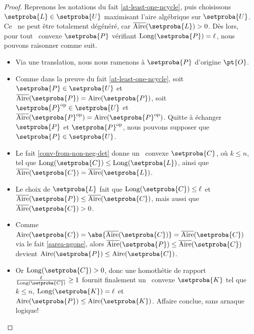 \begin{proof}
    Reprenons les notations du fait \ref{at-least-one-ncycle}, puis 
    choisissons $\setproba{L} \in \setproba{U}$ maximisant l'aire algébrique sur $\setproba{U}$.
    Ce \ncycle\ ne peut être totalement dégénéré, car $\sarea{\setproba{L}} > 0$.
    Dès lors, pour tout \ngone\ convexe $\setproba{P}$ vérifiant $\cyclelen{\setproba{P}} = \ell$, nous pouvons raisonner comme suit. 
	\begin{itemize}
		\item Via une translation, nous nous ramenons à $\setproba{P}$ d'origine $\pt{O}$.


		\item Comme dans la preuve du fait \ref{at-least-one-ncycle},
		soit
		$\setproba{P} \in \setproba{U}$ et $\sarea{\setproba{P}} = \area{\setproba{P}}$,
		soit
		$\setproba{P}^{\mathrm{op}} \in \setproba{U}$ et $\sarea{\setproba{P}^{\mathrm{op}}} = \area{\setproba{P}^{\mathrm{op}}}$.
		Quitte à échanger $\setproba{P}$ et $\setproba{P}^{\mathrm{op}}$, nous pouvons supposer que $\setproba{P} \in \setproba{U}$.


		\item Le fait \ref{conv-from-non-neg-det} donne un \kgone\ convexe $\setproba{C}$, où $k \leq n$, tel que
		$\cyclelen{\setproba{C}} \leq \cyclelen{\setproba{L}}$,
		ainsi que
		$\sarea{\setproba{C}} = \sarea{\setproba{L}}$.


		\item Le choix de $\setproba{L}$ fait que 
		$\cyclelen{\setproba{C}} \leq \ell$
		et
		$\sarea{\setproba{P}} \leq \sarea{\setproba{C}}$,
		mais aussi que
		$\sarea{\setproba{C}} > 0$.


		\item Comme
		$\area{\setproba{C}} = \abs{\sarea{\setproba{C}}} = \sarea{\setproba{C}}$
		via le fait \ref{sarea-ngone},
		alors
		$\sarea{\setproba{P}} \leq \sarea{\setproba{C}}$
		devient
		$\area{\setproba{P}} \leq \area{\setproba{C}}$.


		\item Or $\cyclelen{\setproba{C}} > 0$, donc une homothétie de rapport $\frac{\ell}{\cyclelen{\setproba{C}}} \geq 1$ fournit finalement un \kgone\ convexe $\setproba{K}$ tel que
		$k \leq n$,
		$\cyclelen{\setproba{K}} = \ell$
		et
		$\area{\setproba{P}} \leq \area{\setproba{K}}$.
		Affaire conclue, sans arnaque logique!
	\end{itemize}

	\null\vspace{-6ex}
\end{proof}
